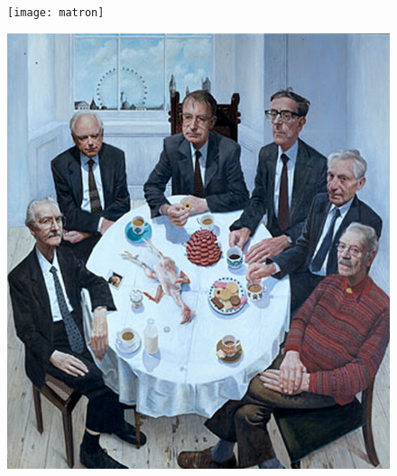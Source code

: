 \def\doubletakeimage{%
  \renewcommand{\topfraction}{.95}  %
  \begin{figure}[t]
    \thispagestyle{caption}
    \texttt{[image: matron]}%
  \end{figure}

  \begin{figure}[tp]
   \hspace*{-\marginparwidth}\includegraphics[height=0.9\textheight]{stuartpearson}
 \end{figure}
}


\doubletakeimage
\lipsum[1-4]

\restoregeometry
\addtocounter{chapter}{-2}
\@toctrue\@specialtrue

